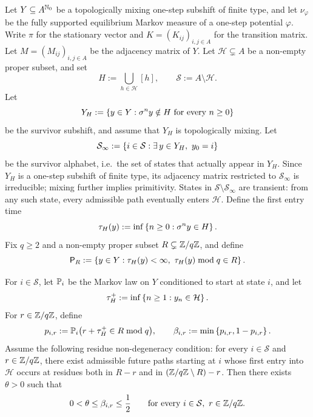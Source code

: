 \begin{theorem}
\label{thm:first-entry-escape-rate}
Let \(Y\subseteq A^{\mathbb{N}_0}\) be a topologically mixing one-step
subshift of finite type, and let \(\nu_\varphi\) be the fully supported
equilibrium Markov measure of a one-step potential \(\varphi\).  Write
\(\pi\) for the stationary vector and \(K=(K_{ij})_{i,j\in A}\) for the
transition matrix.  Let \(M=(M_{ij})_{i,j\in A}\) be the adjacency
matrix of \(Y\).  Let \(\mathcal H\subsetneq A\) be a non-empty proper
subset, and set
\[
  H:=\bigcup_{h\in\mathcal H}[h],
  \qquad
  \mathcal S:=A\setminus \mathcal H.
\]
Let
\[
  Y_H:=\left\{y\in Y:\sigma^n y\notin H\text{ for every }n\geq 0\right\}
\]
be the survivor subshift, and assume that \(Y_H\) is topologically
mixing.  Let
\[
  \mathcal S_\infty
  := \left\{i\in\mathcal S:\exists\,y\in Y_H,\ y_0=i\right\}
\]
be the survivor alphabet, i.e.\ the set of states that actually appear
in \(Y_H\).  Since \(Y_H\) is a one-step subshift of finite type, its
adjacency matrix restricted to \(\mathcal S_\infty\) is irreducible;
mixing further implies primitivity.  States in
\(\mathcal S\setminus\mathcal S_\infty\) are transient: from any such
state, every admissible path eventually enters \(\mathcal H\).
Define the first entry time
\[
  \tau_H(y):=\inf\left\{n\geq 0:\sigma^n y\in H\right\}.
\]
Fix \(q\geq 2\) and a non-empty proper subset
\(R\subsetneq \mathbb{Z}/q\mathbb{Z}\), and define
\[
  \mathsf{P}_R
  := \left\{y\in Y:
      \tau_H(y)<\infty,\
      \tau_H(y)\bmod q\in R \right\}.
\]

For \(i\in\mathcal S\), let \(\mathbb{P}_i\) be the Markov law on \(Y\)
conditioned to start at state \(i\), and let
\[
  \tau_H^+
  := \inf\left\{n\geq 1:y_n\in\mathcal H\right\}.
\]
For \(r\in\mathbb{Z}/q\mathbb{Z}\), define
\[
  p_{i,r}:=\mathbb{P}_i\bigl(r+\tau_H^+\in R \bmod q\bigr),
  \qquad
  \beta_{i,r}:=\min\left\{p_{i,r},1-p_{i,r}\right\}.
\]
Assume the following residue non-degeneracy condition:
for every \(i\in\mathcal S\) and \(r\in\mathbb{Z}/q\mathbb{Z}\), there exist
admissible future paths starting at \(i\) whose first entry into
\(\mathcal H\) occurs at residues both in \(R-r\) and in
\((\mathbb{Z}/q\mathbb{Z}\setminus R)-r\).  Then there exists \(\theta>0\) such that
\[
  0<\theta\leq \beta_{i,r}\leq \frac12
  \qquad
  \text{for every } i\in\mathcal S,\ r\in\mathbb{Z}/q\mathbb{Z}.
\]


\end{theorem}
